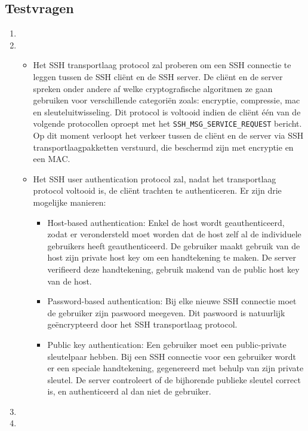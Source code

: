 \documentclass{report}
\begin{document}
	\subsection{Testvragen}
	\begin{enumerate}
		\item {}

		\item {}

		\begin{itemize}
			\item[\info] Het SSH transportlaag protocol zal proberen om een SSH connectie te leggen tussen de SSH cliënt en de SSH server. De cliënt en de server spreken onder andere af welke cryptografische algoritmen ze gaan gebruiken voor verschillende categoriën zoals: encryptie, compressie, mac en sleuteluitwisseling. Dit protocol is voltooid indien de cliënt één van de volgende protocollen oproept met het \texttt{SSH\_MSG\_SERVICE\_REQUEST} bericht. Op dit moment verloopt het verkeer tussen de cliënt en de server via SSH transportlaagpakketten verstuurd, die beschermd zijn met encryptie en een MAC.
			
			\item[\info] Het SSH user authentication protocol zal, nadat het transportlaag protocol voltooid is, de cliënt trachten te authenticeren. Er zijn drie mogelijke manieren:
			\begin{itemize}
				\item Host-based authentication: Enkel de host wordt geauthenticeerd, zodat er verondersteld moet worden dat de host zelf al de individuele gebruikers heeft geauthenticeerd. De gebruiker maakt gebruik van de host zijn private host key om een handtekening te maken. De server verifieerd deze handtekening, gebruik makend van de public host key van de host.
				\item Password-based authentication: Bij elke nieuwe SSH connectie moet de gebruiker zijn paswoord meegeven. Dit paswoord is natuurlijk geëncrypteerd door het SSH transportlaag protocol.
				\item Public key authentication: Een gebruiker moet een public-private sleutelpaar hebben. Bij een SSH connectie voor een gebruiker wordt er een speciale handtekening, gegenereerd met behulp van zijn private sleutel. De server controleert of de bijhorende publieke sleutel correct is, en authenticeerd al dan niet de gebruiker.
			\end{itemize}
		\end{itemize}
		\item {}
		\item {}
		                                    

\end{enumerate}
\end{document}
